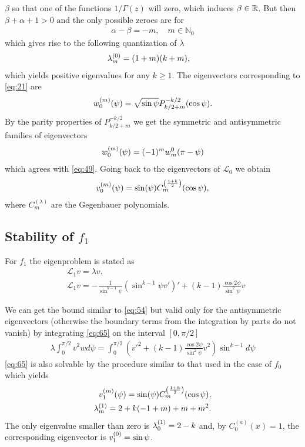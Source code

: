 $\beta$ so that one of the functions $1/\Gamma(z)$ will zero, which
induces $\beta\in\R$. But then $\beta+\alpha+1>0$ and the only
possible zeroes are for
\begin{align}
  \label{eq:60}
  \alpha-\beta=-m,\quad m\in\mathbb{N}_0
\end{align}
which gives rise to the following quantization of $\lambda$
\begin{align}
  \label{eq:61}
  \lb{0}{m}&=(1+m)(k+m),
\end{align}
which yields positive eigenvalues for any $k\ge1$. The eigenvectors
corresponding to \eqref{eq:21} are
\begin{align}
  \label{eq:62}
  \wn{0}{m}(\psi)=\sqrt{\sin\psi}P_{k/2+m}^{-k/2}(\cos\psi).
\end{align}
By the parity properties of $P_{k/2+m}^{-k/2}$ we get the symmetric
and antisymmetric families of eigenvectors
\begin{align}
  \label{eq:63}
  \wn{0}{m}(\psi)=(-1)^m w_m^0(\pi-\psi)
\end{align}
which agrees with \eqref{eq:49}. Going back to the eigenvectors of
$\mathcal{L}_0$ we obtain
\begin{align}
  \label{eq:64}
  \vn{0}{m}(\psi)=\sin(\psi)C^{\left(\frac{1+k}{2}\right)}_m(\cos\psi),
\end{align}
where $C^{(\lambda)}_m$ are the Gegenbauer polynomials.

\subsection{Stability of $f_1$}
\label{sec:stability-f_1}

For $f_1$ the eigenproblem is stated as
\begin{align}
  \label{eq:65}
  &\mathcal{L}_1 v = \lambda v. \\
  \label{eq:66}
  &\mathcal{L}_1 v = -\frac{1}{\sin^{k-1}\psi}\left(\sin^{k-1}\psi
      v'\right)'+(k-1)\frac{\cos2\psi}{\sin^2\psi}v
\end{align}

We can get the bound similar to \eqref{eq:54} but valid only for the
antisymmetric eigenvectors (otherwise the boundary terms from the
integration by parts do not vanish) by integrating \eqref{eq:65} on
the interval $[0,\pi/2]$
\begin{align}
  \label{eq:f1_lambda}
  \lambda\int_0^{\pi/2} v^2w
  d\psi=\int_0^{\pi/2}\left(v'^2+(k-1)\frac{\cos2\psi}{\sin^2\psi}v^2\right)\sin^{k-1}d\psi
\end{align}
\eqref{eq:65} is also solvable by the procedure similar to that used
in the case of $f_0$ which yields
\begin{align}
  \label{eq:67}
  \vn{1}{m}(\psi)=\sin(\psi)C^{\left(\frac{1+k}{2}\right)}_m(\cos\psi), \\
  \label{eq:68}
  \lb{1}{m}=2 + k (-1 + m) + m + m^2.
\end{align}
The only eigenvalue smaller than zero is $\lb{1}{0}=2-k$ and, by
$C^{(a)}_0(x)=1$, the corresponding eigenvector is $\vn{1}{0}=\sin\psi$.

